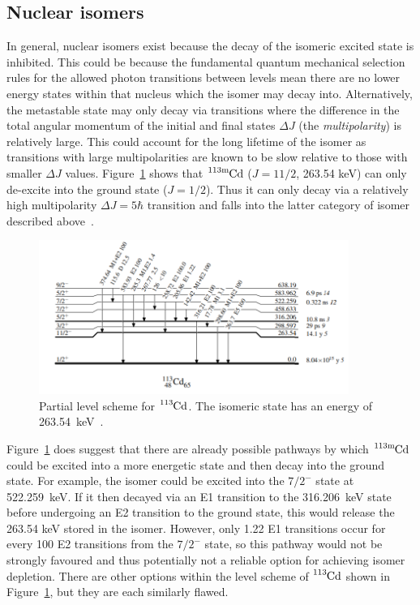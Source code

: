 \documentclass[12pt,a4paper]{article}
\newcommand{\cdm}{\ce{^{113\text{m}}Cd}}
\begin{document}
\subsection*{Nuclear isomers}
In general, nuclear isomers exist because the decay of the isomeric excited state is inhibited.
This could be because the fundamental quantum mechanical selection rules for the allowed photon transitions between levels mean there are no lower energy states within that nucleus which the isomer may decay into.
Alternatively, the metastable state may only decay via transitions where the difference in the total angular momentum of the initial and final states $\Delta J$ (the \textit{multipolarity}) is relatively large.
This could account for the long lifetime of the isomer as transitions with large multipolarities are known to be slow relative to those with smaller $\Delta J$ values. 
Figure~\ref{fig:cd113} shows that $\cdm$ ($J = 11/2$, 263.54 keV) can only de-excite into the ground state ($J = 1/2$).
Thus it can only decay via a relatively high multipolarity $\Delta J = 5\hbar$ transition and falls into the latter category of isomer described above~\cite{blachot_notitle_111}.
\begin{figure}[htbp]
	\centering
	\includegraphics[width=0.9\textwidth]{113cd_partial_level_scheme_ENSDF.png}
	\caption{Partial level scheme for $\ce{^{113}Cd}$. The isomeric state has an energy of 263.54~keV~\cite{blachot_notitle_111}.}
\label{fig:cd113}
\end{figure}

\medskip
\noindent
Figure~\ref{fig:cd113} does suggest that there are already possible pathways by which $\cdm$ could be excited into a more energetic state and then decay into the ground state.
For example, the isomer could be excited into the $7/2^-$ state at 522.259~keV.
If it then decayed via an E1 transition to the 316.206~keV state before undergoing an E2 transition to the ground state, this would release the 263.54 keV stored in the isomer.
However, only 1.22 E1 transitions occur for every 100 E2 transitions from the $7/2^-$ state, so this pathway would not be strongly favoured and thus potentially not a reliable option for achieving isomer depletion. %
There are other options within the level scheme of $\ce{^{113}Cd}$ shown in Figure~\ref{fig:cd113}, but they are each similarly flawed.
\end{document}
